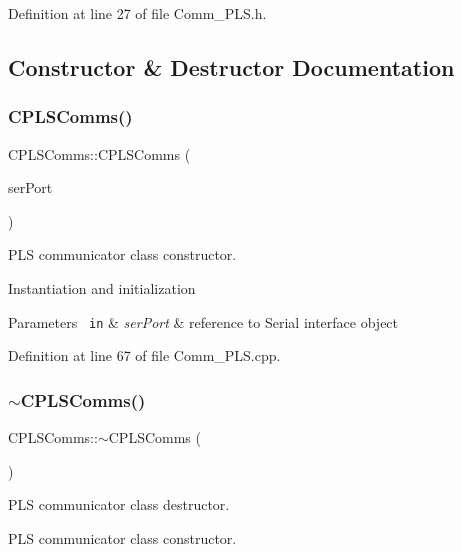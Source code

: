 Definition at line 27 of file Comm\+\_\+\+P\+L\+S.\+h.



\subsection{Constructor \& Destructor Documentation}
\mbox{\label{class_c_p_l_s_comms_ae1ec975e5e402b405389d47b8acd0a63}} 
\subsubsection{\texorpdfstring{CPLSComms()}{CPLSComms()}}
{\footnotesize\ttfamily C\+P\+L\+S\+Comms\+::\+C\+P\+L\+S\+Comms (\begin{DoxyParamCaption}\item[{\mbox{\hyperlink{class_c_serial}{C\+Serial}} \&}]{ser\+Port }\end{DoxyParamCaption})}



P\+LS communicator class constructor. 

Instantiation and initialization 
\begin{DoxyParams}[1]{Parameters}
\mbox{\texttt{ in}}  & {\em ser\+Port} & reference to Serial interface object \\
\hline
\end{DoxyParams}


Definition at line 67 of file Comm\+\_\+\+P\+L\+S.\+cpp.

\mbox{\label{class_c_p_l_s_comms_aac23966ff823f63a2ff524bbb706e549}} 
\subsubsection{\texorpdfstring{$\sim$CPLSComms()}{~CPLSComms()}}
{\footnotesize\ttfamily C\+P\+L\+S\+Comms\+::$\sim$\+C\+P\+L\+S\+Comms (\begin{DoxyParamCaption}{ }\end{DoxyParamCaption})}



P\+LS communicator class destructor. 

P\+LS communicator class constructor. 

